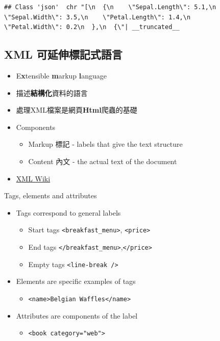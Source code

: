 \documentclass[]{book}
\providecommand{\tightlist}{%
  \setlength{\itemsep}{0pt}\setlength{\parskip}{0pt}}
\theoremstyle{definition}
\theoremstyle{definition}
\theoremstyle{remark}
\begin{document}
\begin{verbatim}
## Class 'json'  chr "[\n  {\n    \"Sepal.Length\": 5.1,\n    \"Sepal.Width\": 3.5,\n    \"Petal.Length\": 1.4,\n    \"Petal.Width\": 0.2\n  },\n  {\"| __truncated__
\end{verbatim}

\subsection{XML 可延伸標記式語言}\label{xml}

\begin{itemize}
\tightlist
\item
  E\textbf{x}tensible \textbf{m}arkup \textbf{l}anguage
\item
  描述\textbf{結構化}資料的語言
\item
  處理XML檔案是網頁\textbf{Html}爬蟲的基礎
\item
  Components

  \begin{itemize}
  \tightlist
  \item
    Markup 標記 - labels that give the text structure
  \item
    Content 內文 - the actual text of the document
  \end{itemize}
\item
  \href{https://zh.wikipedia.org/wiki/XML}{XML Wiki}
\end{itemize}

Tags, elements and attributes

\begin{itemize}
\tightlist
\item
  Tags correspond to general labels

  \begin{itemize}
  \tightlist
  \item
    Start tags \texttt{\textless{}breakfast\_menu\textgreater{}},
    \texttt{\textless{}price\textgreater{}}
  \item
    End tags
    \texttt{\textless{}/breakfast\_menu\textgreater{}},\texttt{\textless{}/price\textgreater{}}
  \item
    Empty tags \texttt{\textless{}line-break\ /\textgreater{}}
  \end{itemize}
\item
  Elements are specific examples of tags

  \begin{itemize}
  \tightlist
  \item
    \texttt{\textless{}name\textgreater{}Belgian\ Waffles\textless{}/name\textgreater{}}
  \end{itemize}
\item
  Attributes are components of the label

  \begin{itemize}
  \tightlist
  \item
    \texttt{\textless{}book\ category="web"\textgreater{}}
  \end{itemize}
\end{itemize}
\end{document}
